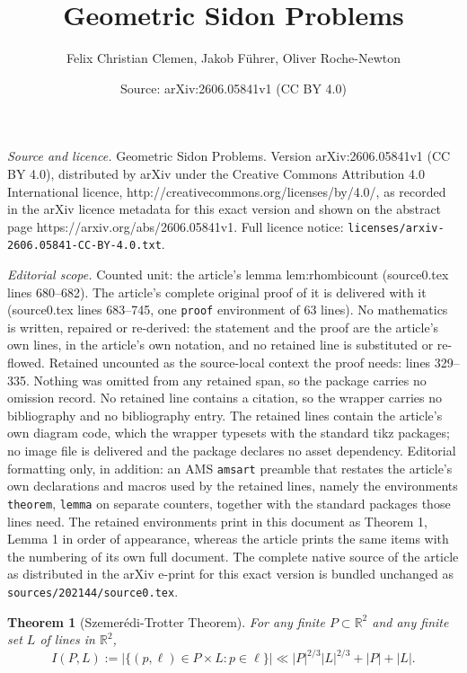 \documentclass[10pt,a4paper]{amsart}
\title{Geometric Sidon Problems}
\author{Felix Christian Clemen, Jakob F\"uhrer, Oliver Roche-Newton}
\date{Source: arXiv:2606.05841v1 (CC BY 4.0)}
\newtheorem{theorem}{Theorem}
\begin{document}
\maketitle

\noindent\emph{Source and licence.} Geometric Sidon Problems. Version arXiv:2606.05841v1 (CC BY 4.0), distributed by arXiv under the Creative Commons Attribution 4.0 International licence, http://creativecommons.org/licenses/by/4.0/, as recorded in the arXiv licence metadata for this exact version and shown on the abstract page https://arxiv.org/abs/2606.05841v1. Full licence notice: \texttt{licenses/arxiv-2606.05841-CC-BY-4.0.txt}.\par\smallskip

\noindent\textit{Editorial scope.} Counted unit: the article's lemma lem:rhombicount (source0.tex lines 680--682). The article's complete original proof of it is delivered with it (source0.tex lines 683--745, one \texttt{proof} environment of 63 lines). No mathematics is written, repaired or re-derived: the statement and the proof are the article's own lines, in the article's own notation, and no retained line is substituted or re-flowed.  Retained uncounted as the source-local context the proof needs: lines 329--335.  Nothing was omitted from any retained span, so the package carries no omission record.  No retained line contains a citation, so the wrapper carries no bibliography and no bibliography entry.  The retained lines contain the article's own diagram code, which the wrapper typesets with the standard tikz packages; no image file is delivered and the package declares no asset dependency.  Editorial formatting only, in addition: an AMS \texttt{amsart} preamble that restates the article's own declarations and macros used by the retained lines, namely the environments \texttt{theorem}, \texttt{lemma} on separate counters, together with the standard packages those lines need.  The retained environments print in this document as Theorem 1, Lemma 1 in order of appearance, whereas the article prints the same items with the numbering of its own full document.  The complete native source of the article as distributed in the arXiv e-print for this exact version is bundled unchanged as \texttt{sources/202144/source0.tex}.
\begin{theorem}[Szemer\'{e}di-Trotter Theorem]
\label{ST}
For any finite $P \subset \mathbb R^2$ and any finite set $L$ of lines in $\mathbb R^2$,
\[
I(P,L) := | \{ (p,\ell) \in P \times L : p \in \ell \}| \ll |P|^{2/3}| L|^{2/3}   + |P| + |L|.
\]
\end{theorem}
\end{document}
